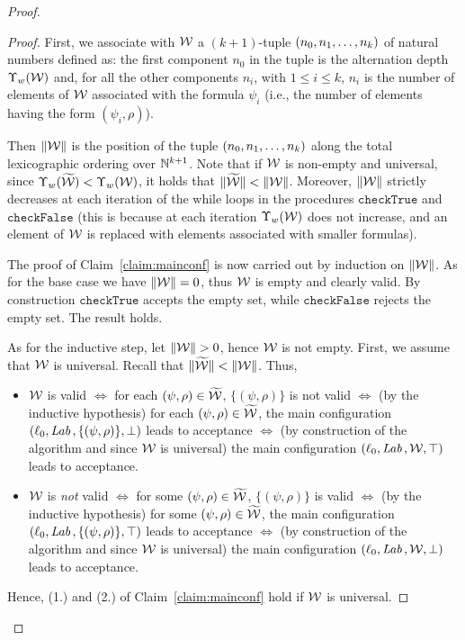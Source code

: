 \begin{proof}
\begin{proof}
First, we associate with ${\mathcal{W}}$ a $(k+1)$-tuple $(n_0,n_1,\ldots,n_k)$ of natural numbers defined as: the first component $n_0$ in the tuple is the alternation depth $\Upsilon_w({\mathcal{W}})$ and,
  for all the other components $n_i$, with $1\leq i\leq k$, $n_i$ is the number of elements of ${\mathcal{W}}$ associated with the formula $\psi_i$ (i.e., the number of elements having the form $(\psi_i,\rho)$).
 
 Then $\|{{\mathcal{W}}}\|$ is the position of the tuple $(n_0,n_1,\ldots,n_k)$ along the total lexicographic ordering over $\mathbb{N}^{k+1}$. Note that if ${\mathcal{W}}$ is non-empty and universal, since $\Upsilon_w(\widetilde{{\mathcal{W}}})<\Upsilon_w({\mathcal{W}})$, it holds that $\|{\widetilde{{\mathcal{W}}}}\|<\|{{\mathcal{W}}}\|$. Moreover, $\|{{\mathcal{W}}}\|$ strictly decreases at each iteration of the while loops   in the procedures
$\texttt{checkTrue}$ and $\texttt{checkFalse}$ (this is because at each iteration $\Upsilon_w({\mathcal{W}})$ does not increase, and  an element of ${\mathcal{W}}$ is replaced with elements associated with smaller formulas).

The proof of Claim~\ref{claim:mainconf} is now carried out by induction on $\|{{\mathcal{W}}}\|$. As for the base case we have  $\|{{\mathcal{W}}}\|=0$, thus ${\mathcal{W}}$ is empty and clearly valid. By construction $\texttt{checkTrue}$ accepts the empty set, while  $\texttt{checkFalse}$ rejects the empty set.
The result holds. 

As for the inductive step, let $\Norm{\WS}>0$, hence ${\mathcal{W}}$ is not empty.
First, we assume that ${\mathcal{W}}$ is universal. Recall that $\|{\widetilde{{\mathcal{W}}}}\|<\|{{\mathcal{W}}}\|$.  Thus,
\begin{itemize}
  \item
   ${\mathcal{W}}$ is valid $\Longleftrightarrow$   for each $(\psi,\rho)\in \widetilde{{\mathcal{W}}}$,
    $\{(\psi,\rho)\}$ is not valid  $\Longleftrightarrow$ (by the inductive hypothesis) for each $(\psi,\rho)\in \widetilde{{\mathcal{W}}}$, the main configuration $(\ell_0,\textit{Lab}\,,\allowbreak\{(\psi,\rho)\},\operatorname{\bot})$ leads to acceptance $\Longleftrightarrow$ (by construction of the algorithm and since ${\mathcal{W}}$ is universal) the main configuration $(\ell_0,\textit{Lab}\,,{\mathcal{W}},\operatorname{\top})$ leads to acceptance.
  \item  
   ${\mathcal{W}}$ is \emph{not}  valid $\Longleftrightarrow$   for some $(\psi,\rho)\in \widetilde{{\mathcal{W}}}$,
    $\{(\psi,\rho)\}$ is  valid  $\Longleftrightarrow$ (by the inductive hypothesis) for some $(\psi,\rho)\in \widetilde{{\mathcal{W}}}$, the main configuration $(\ell_0,\textit{Lab}\,,\allowbreak \{(\psi,\rho)\},\operatorname{\top})$ leads to acceptance $\Longleftrightarrow$ (by construction of the algorithm and since ${\mathcal{W}}$ is universal) the main configuration $(\ell_0,\textit{Lab}\,,{\mathcal{W}},\operatorname{\bot})$ leads to acceptance.
\end{itemize}
%
Hence, (1.) and (2.) of Claim~\ref{claim:mainconf} hold if ${\mathcal{W}}$ is universal. 


\end{proof}
\end{proof}
